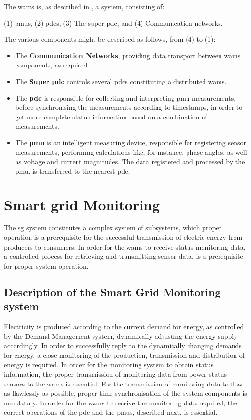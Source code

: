 The \acrshort{wams} is, as described in  \cite{kumar2015monitoring}, a  system, consisting of:

(1) \acrshort{pmu}s, (2) \acrshort{pdc}s, (3) The super \acrshort{pdc}, and (4) Communication networks.

The various components might be described as follows, from (4) to (1):
\begin{itemize}
    \item The \textbf{Communication Networks}, providing data transport between \acrshort{wams} components, as required.
    \item The \textbf{Super \acrshort{pdc}} controls several \acrshort{pdc}s constituting a distributed \acrshort{wams}.
\item The \textbf{\acrfull{pdc}} is responsible for collecting and interpreting \acrshort{pmu} measurements, before synchronising the measurements according to timestamps, in order to get more complete status information based on a combination of measurements.
    \item The \textbf{\acrfull{pmu}} is an intelligent measuring device, responsible for registering sensor measurements,  performing calculations like, for instance, phase angles, as well as voltage and current magnitudes. The data registered and processed by the \acrshort{pmu}, is transferred to the nearest \acrshort{pdc}.
    \end{itemize}





\section{Smart grid Monitoring}
The \acrlong{sg} system constitutes a complex system of subsystems, which proper operation is a prerequisite for the successful transmission of electric energy from producers to consumers. 
In order for the \acrshort{wams} to receive status monitoring data, a controlled process for retrieving and transmitting sensor data, is a prerequisite for proper system operation.



\subsection{Description of the Smart Grid  Monitoring system}
Electricity is produced according to the current demand for energy, as controlled by the Demand Management system, dynamically adjusting the energy supply accordingly. In order to successfully reply to the dynamically changing demands for energy, a close monitoring of the production, transmission and distribution of energy is required. In order for the monitoring system to obtain status information, the proper transmission of monitoring data from power status sensors to the \acrshort{wams} is essential. For the transmission of monitoring data to flow as flawlessly as possible, proper time synchronisation of the system components is mandatory.
In order for the \acrshort{wams} to receive the monitoring data required, the correct operations of the \acrshort{pdc} and the \acrshort{pmu}s, described next, is essential.


